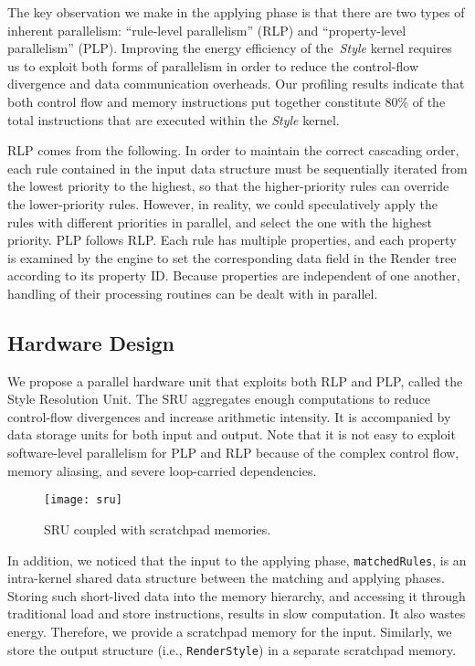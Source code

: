The key observation we make in the applying phase is that there are two types of inherent parallelism: ``rule-level parallelism'' (RLP) and ``property-level parallelism'' (PLP). Improving the energy efficiency of the~\textit{Style} kernel requires us to exploit both forms of parallelism in order to reduce the control-flow divergence and data communication overheads. Our profiling results indicate that both control flow and memory instructions put together constitute 80\% of the total instructions that are executed within the \textit{Style} kernel.

RLP comes from the following. In order to maintain the correct cascading order, each rule contained in the input data structure must be sequentially iterated from the lowest priority to the highest, so that the higher-priority rules can override the lower-priority rules. However, in reality, we could speculatively apply the rules with different priorities in parallel, and select the one with the highest priority. PLP follows RLP. Each rule has multiple properties, and each property is examined by the engine to set the corresponding data field in the Render tree according to its property ID. Because properties are independent of one another, handling of their processing routines can be dealt with in parallel.

\subsection{Hardware Design}
\label{sec:sru:hw}

We propose a parallel hardware unit that exploits both RLP and PLP, called the Style Resolution Unit. The SRU aggregates enough computations to reduce control-flow divergences and increase arithmetic intensity. It is accompanied by data storage units for both input and output. Note that it is not easy to exploit software-level parallelism for PLP and RLP because of the complex control flow, memory aliasing, and severe loop-carried dependencies.

\begin{figure}[t]
\centering
\texttt{[image: sru]}
\caption{SRU coupled with scratchpad memories.}
\label{fig:sru}
\end{figure}

In addition, we noticed that the input to the applying phase, \texttt{matchedRules}, is an intra-kernel shared data structure between the matching and applying phases. Storing such short-lived data into the memory hierarchy, and accessing it through traditional load and store instructions, results in slow computation. It also wastes energy. Therefore, we provide a scratchpad memory for the input. Similarly, we store the output structure (i.e., \texttt{RenderStyle}) in a separate scratchpad memory.

